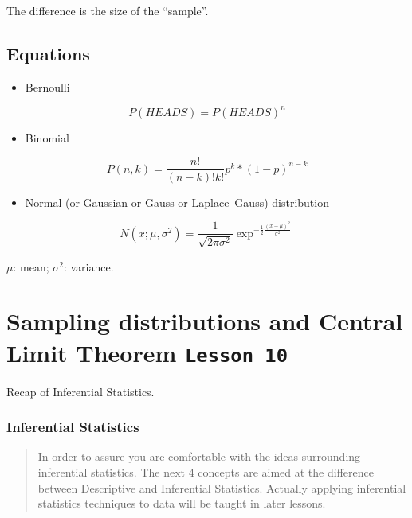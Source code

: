 \documentclass[]{book}
\providecommand{\tightlist}{%
  \setlength{\itemsep}{0pt}\setlength{\parskip}{0pt}}
\begin{document}
The difference is the size of the ``sample''.

\subsection{Equations}\label{equations}

\begin{itemize}
\tightlist
\item
  Bernoulli
\end{itemize}

\[ P(HEADS) = P(HEADS)^n \tag{1}\]

\begin{itemize}
\tightlist
\item
  Binomial
\end{itemize}

\[P(n,k) = \frac{n!}{(n-k)!k!} p^k * (1-p)^{n-k} \tag{2}\]

\begin{itemize}
\tightlist
\item
  Normal (or Gaussian or Gauss or Laplace--Gauss) distribution
\end{itemize}

\[N(x;\mu,\sigma^2) = \frac{1}{\sqrt{2\pi\sigma^2}}\exp^{-\frac{1}{2} \frac{(x-\mu)^2}{\sigma^2}} \tag{3}\]

\(\mu\): mean; \(\sigma^2\): variance.

\section{\texorpdfstring{Sampling distributions and Central Limit
Theorem
\texttt{Lesson\ 10}}{Sampling distributions and Central Limit Theorem Lesson 10}}\label{sampling-distributions-and-central-limit-theorem-lesson-10}

Recap of Inferential Statistics.

\subsubsection{Inferential Statistics}\label{inferential-statistics}

\begin{quote}
In order to assure you are comfortable with the ideas surrounding
inferential statistics. The next 4 concepts are aimed at the difference
between Descriptive and Inferential Statistics. Actually applying
inferential statistics techniques to data will be taught in later
lessons.
\end{quote}
\end{document}
